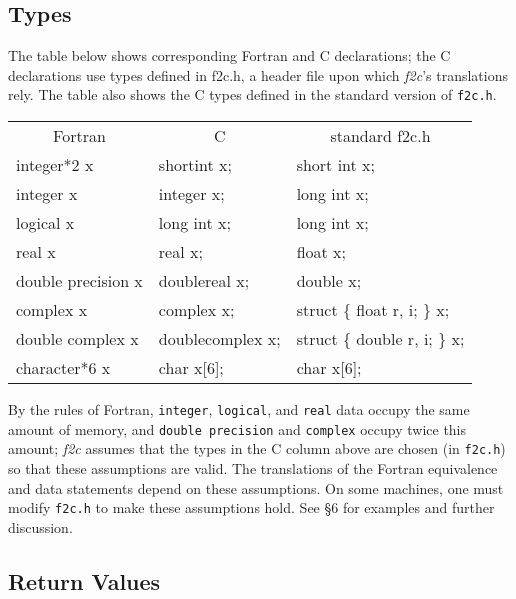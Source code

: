 \documentclass[12pt]{article}
\begin{document}
\subsection*{Types}

The table below shows corresponding Fortran and C declarations; the C declarations use types defined in f2c.h, a header file upon which \emph{f2c}’s translations rely. The table also shows the C types defined in the standard version of \verb|f2c.h|.
\begin{center}
\begin{tabular}{|lll|}\hline
    \multicolumn{1}{|c}{Fortran} &
    \multicolumn{1}{c}{C} &
    \multicolumn{1}{c|}{standard f2c.h}
    \\[0.5ex]
    integer*2 x &
    shortint x; &
    short int x;
    \\
    integer x &
    integer x; &
    long int x;
    \\
    logical x &
    long int x; &
    long int x;
    \\
    real x &
    real x; &
    float x;
    \\
    double precision x &
    doublereal x; &
    double x;
    \\
    complex x &
    complex x; &
    struct \{ float r, i; \} x;
    \\
    double complex x &
    doublecomplex x; &
    struct \{ double r, i; \} x;
    \\
    character*6 x &
    char x[6]; &
    char x[6];
    \\\hline
\end{tabular}
\end{center}
By the rules of Fortran, \verb|integer|, \verb|logical|, and \verb|real| data occupy the same amount of memory, and \verb|double precision| and \verb|complex| occupy twice this amount; \emph{f2c} assumes that the types in the C column above are chosen (in \verb|f2c.h|) so that these assumptions are valid. The translations of the Fortran equivalence and data statements depend on these assumptions. On some machines, one must modify \verb|f2c.h| to make these assumptions hold. See §6 for examples and further discussion.

\subsection*{Return Values}
\end{document}
